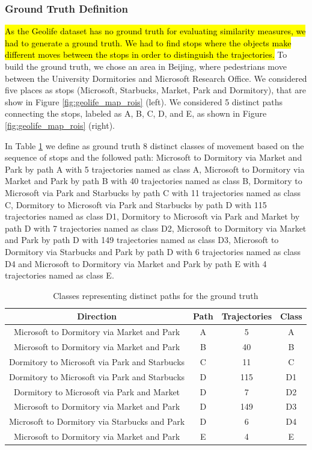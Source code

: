 \documentclass[12pt]{article}
\begin{document}
\subsubsection{Ground Truth Definition}
\hl{As the Geolife dataset has no ground truth for evaluating similarity measures, we had to generate a ground truth. We had to find stops where the objects make different moves between the stops in order to distinguish the trajectories.}
To build the ground truth, we chose an area in Beijing, where pedestrians move between the University Dormitories and Microsoft Research Office. We considered five places as stops (Microsoft, Starbucks, Market, Park and Dormitory), that are show in Figure \ref{fig:geolife_map_rois} (left). We considered 5 distinct paths connecting the stops, labeled as A, B, C, D, and E, as shown in Figure \ref{fig:geolife_map_rois} (right).

In Table \ref{tab:geolife_dataset} we define as ground truth 8 distinct classes of movement based on the sequence of stops and the followed path: Microsoft to Dormitory via Market and Park by path A with 5 trajectories named as class A, Microsoft to Dormitory via Market and Park by path B with 40 trajectories named as class B, Dormitory to Microsoft via Park and Starbucks by path C with 11 trajectories named as class C, Dormitory to Microsoft via Park and Starbucks by path D with 115 trajectories named as class D1, Dormitory to Microsoft via Park and Market by path D with 7 trajectories named as class D2, Microsoft to Dormitory via Market and Park by path D with 149 trajectories named as class D3, Microsoft to Dormitory via Starbucks and Park by path D with 6 trajectories named as class D4 and Microsoft to Dormitory via Market and Park by path E with 4 trajectories named as class E.

\begin{table}[ht!]
\scriptsize
  \centering
  \begin{tabular}{|c|c|c|c|}
  	\hline
 Direction & Path &  Trajectories & Class \\
  	\hline
Microsoft to Dormitory via Market and Park& A & 5 & A \\
Microsoft to Dormitory via Market and Park& B & 40&B \\
Dormitory to Microsoft via Park and Starbucks& C & 11&C \\
Dormitory to Microsoft via Park and Starbucks& D & 115&D1 \\
Dormitory to Microsoft via Park and Market& D & 7&D2 \\
Microsoft to Dormitory via Market and Park& D & 149&D3 \\
Microsoft to Dormitory via Starbucks and Park& D & 6&D4 \\
Microsoft to Dormitory via Market and Park& E & 4& E \\
    \hline
  \end{tabular}
  \caption{Classes representing distinct paths for the ground truth}
  \label{tab:geolife_dataset}
\end{table}
\end{document}
